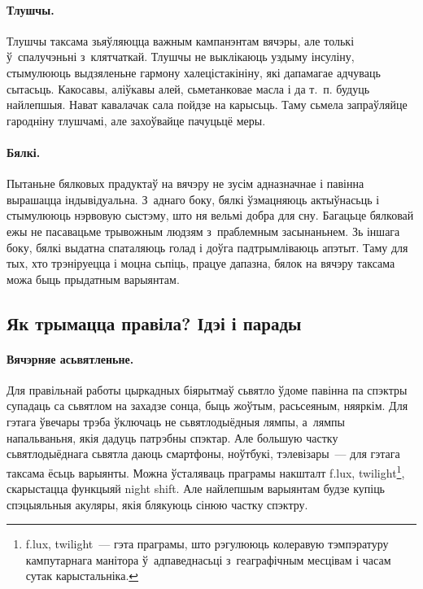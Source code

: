 \paragraph{Тлушчы.}
Тлушчы таксама зьяўляюцца важным кампанэнтам вячэры, але толькі ў~спалучэньні з~клятчаткай. Тлушчы не выклікаюць уздыму інсуліну, стымулююць выдзяленьне гармону халецістакініну, які дапамагае адчуваць сытасьць. Какосавы, аліўкавы алей, сьметанковае масла і да т.~п. будуць найлепшыя. Нават кавалачак сала пойдзе на карысьць. Таму сьмела запраўляйце гародніну тлушчамі, але захоўвайце пачуцьцё меры.


\paragraph{Бялкі.}
Пытаньне бялковых прадуктаў на вячэру не зусім адназначнае і павінна вырашацца індывідуальна. З~аднаго боку, бялкі ўзмацняюць актыўнасьць і стымулююць нэрвовую сыстэму, што ня вельмі добра для сну. Багацьце бялковай ежы не пасавацьме трывожным людзям з~праблемным засынаньнем. Зь іншага боку, бялкі выдатна спаталяюць голад і доўга падтрымліваюць апэтыт. Таму для тых, хто трэніруецца і моцна сьпіць, працуе дапазна, бялок на вячэру таксама можа быць прыдатным варыянтам.

\subsection{Як трымацца правіла? Ідэі і парады}

\paragraph{Вячэрняе асьвятленьне.}
Для правільнай работы цыркадных біярытмаў сьвятло ўдоме павінна па спэктры супадаць са сьвятлом на захадзе сонца, быць жоўтым, расьсеяным, няяркім. Для гэтага ўвечары трэба ўключаць не сьвятлодыёдныя лямпы, а~лямпы напальваньня, якія дадуць патрэбны спэктар. Але большую частку сьвятлодыёднага сьвятла даюць смартфоны, ноўтбукі, тэлевізары~--- для гэтага таксама ёсьць варыянты. Можна ўсталяваць праграмы накшталт f.lux, twilight\footnote{f.lux, twilight~--- гэта праграмы, што рэгулююць колеравую тэмпэратуру кампутарнага манітора ў~адпаведнасьці з~геаграфічным месцівам і часам сутак карыстальніка.}, скарыстацца функцыяй night shift. Але найлепшым варыянтам будзе купіць спэцыяльныя акуляры, якія блякуюць сінюю частку спэктру.

